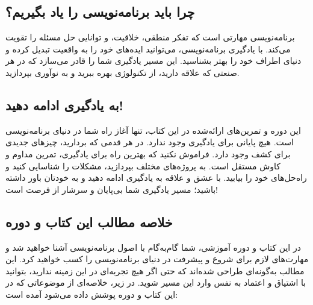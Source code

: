 \documentclass[a4paper,12pt]{article}
\begin{document}
	\subsection*{چرا باید برنامه‌نویسی را یاد بگیریم؟}
	برنامه‌نویسی مهارتی است که تفکر منطقی، خلاقیت، و توانایی حل مسئله را تقویت می‌کند. با یادگیری برنامه‌نویسی، می‌توانید ایده‌های خود را به واقعیت تبدیل کرده و دنیای اطراف خود را بهتر بشناسید. این مسیر یادگیری شما را قادر می‌سازد که در هر صنعتی که علاقه دارید، از تکنولوژی بهره ببرید و به نوآوری بپردازید.
	
	\subsection*{به یادگیری ادامه دهید!}
	این دوره و تمرین‌های ارائه‌شده در این کتاب، تنها آغاز راه شما در دنیای برنامه‌نویسی است. هیچ پایانی برای یادگیری وجود ندارد. در هر قدمی که بردارید، چیزهای جدیدی برای کشف وجود دارد. فراموش نکنید که بهترین راه برای یادگیری، تمرین مداوم و کاوش مستقل است. به پروژه‌های مختلف بپردازید، مشکلات را شناسایی کنید و راه‌حل‌های خود را بیابید. با عشق و علاقه به یادگیری ادامه دهید و به خودتان باور داشته باشید؛ مسیر یادگیری شما بی‌پایان و سرشار از فرصت است!
	
	\subsection*{خلاصه مطالب این کتاب و دوره}
	
	در این کتاب و دوره آموزشی، شما گام‌به‌گام با اصول برنامه‌نویسی آشنا خواهید شد و مهارت‌های لازم برای شروع و پیشرفت در دنیای برنامه‌نویسی را کسب خواهید کرد. این مطالب به‌گونه‌ای طراحی شده‌اند که حتی اگر هیچ تجربه‌ای در این زمینه ندارید، بتوانید با اشتیاق و اعتماد به نفس وارد این مسیر شوید. در زیر، خلاصه‌ای از موضوعاتی که در این کتاب و دوره پوشش داده می‌شود آمده است:
	
\end{document}
